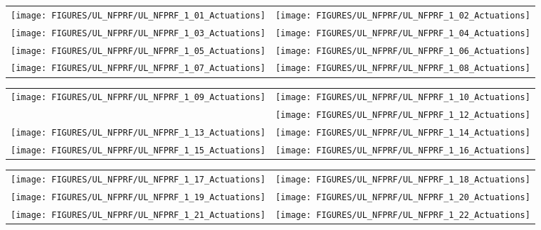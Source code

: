 \begin{figure}[p]
\begin{tabular*}{\textwidth}{l@{\extracolsep{\fill}}r}
\texttt{[image: FIGURES/UL\_NFPRF/UL\_NFPRF\_1\_01\_Actuations]} &
\texttt{[image: FIGURES/UL\_NFPRF/UL\_NFPRF\_1\_02\_Actuations]} \\
\texttt{[image: FIGURES/UL\_NFPRF/UL\_NFPRF\_1\_03\_Actuations]} &
\texttt{[image: FIGURES/UL\_NFPRF/UL\_NFPRF\_1\_04\_Actuations]} \\
\texttt{[image: FIGURES/UL\_NFPRF/UL\_NFPRF\_1\_05\_Actuations]} &
\texttt{[image: FIGURES/UL\_NFPRF/UL\_NFPRF\_1\_06\_Actuations]} \\
\texttt{[image: FIGURES/UL\_NFPRF/UL\_NFPRF\_1\_07\_Actuations]} &
\texttt{[image: FIGURES/UL\_NFPRF/UL\_NFPRF\_1\_08\_Actuations]} \\
\end{tabular*}
\label{UL_NFPRF_1}
\end{figure}

\begin{figure}[p]
\begin{tabular*}{\textwidth}{l@{\extracolsep{\fill}}r}
\texttt{[image: FIGURES/UL\_NFPRF/UL\_NFPRF\_1\_09\_Actuations]} &
\texttt{[image: FIGURES/UL\_NFPRF/UL\_NFPRF\_1\_10\_Actuations]} \\
&
\texttt{[image: FIGURES/UL\_NFPRF/UL\_NFPRF\_1\_12\_Actuations]} \\
\texttt{[image: FIGURES/UL\_NFPRF/UL\_NFPRF\_1\_13\_Actuations]} &
\texttt{[image: FIGURES/UL\_NFPRF/UL\_NFPRF\_1\_14\_Actuations]} \\
\texttt{[image: FIGURES/UL\_NFPRF/UL\_NFPRF\_1\_15\_Actuations]} &
\texttt{[image: FIGURES/UL\_NFPRF/UL\_NFPRF\_1\_16\_Actuations]} \\
\end{tabular*}
\label{UL_NFPRF_2}
\end{figure}

\begin{figure}[p]
\begin{tabular*}{\textwidth}{l@{\extracolsep{\fill}}r}
\texttt{[image: FIGURES/UL\_NFPRF/UL\_NFPRF\_1\_17\_Actuations]} &
\texttt{[image: FIGURES/UL\_NFPRF/UL\_NFPRF\_1\_18\_Actuations]} \\
\texttt{[image: FIGURES/UL\_NFPRF/UL\_NFPRF\_1\_19\_Actuations]} &
\texttt{[image: FIGURES/UL\_NFPRF/UL\_NFPRF\_1\_20\_Actuations]} \\
\texttt{[image: FIGURES/UL\_NFPRF/UL\_NFPRF\_1\_21\_Actuations]} &
\texttt{[image: FIGURES/UL\_NFPRF/UL\_NFPRF\_1\_22\_Actuations]}
\end{tabular*}
\label{UL_NFPRF_3}
\end{figure}

